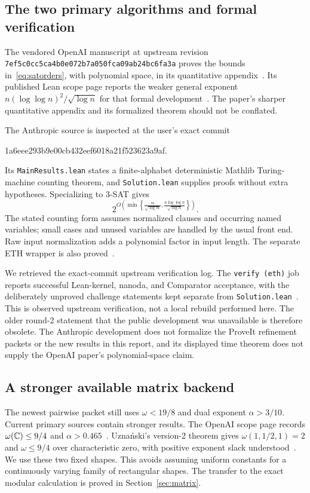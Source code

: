 \subsection{The two primary algorithms and formal verification}

The vendored OpenAI manuscript at upstream revision
\nolinkurl{7ef5c0cc5ca4b0e072b7a050fca09ab24bc6fa3a} proves the bounds
in~\eqref{eq:satorders}, with polynomial space, in its quantitative
appendix~\cite{openai}. Its published Lean scope page reports the weaker
general exponent $n(\log\log n)^2/\sqrt{\log n}$ for that formal
development~\cite{openaiscope}. The paper's sharper quantitative appendix
and its formalized theorem should not be conflated.

The Anthropic source is inspected at the user's exact commit
\begin{center}\small\ttfamily
1a6eee293b9e00cb432eef6018a21f523623a9af.
\end{center}
Its \texttt{MainResults.lean} states a finite-alphabet deterministic
Mathlib Turing-machine counting theorem, and \texttt{Solution.lean}
supplies proofs without extra hypotheses. Specializing to 3-SAT gives
\begin{equation}\label{eq:anthropic}
 2^{O\left(\min\left\{
       \frac{m}{\sqrt{\log m}},
       \frac{n\log\log n}{\sqrt{\log n}}
       \right\}\right)}.
\end{equation}
The stated counting form assumes normalized clauses and occurring named
variables; small cases and unused variables are handled by the usual
front end. Raw input normalization adds a polynomial factor in input
length. The separate ETH wrapper is also proved~\cite{anthropiccode}.

We retrieved the exact-commit upstream verification log. The
\texttt{verify (eth)} job reports successful Lean-kernel, nanoda, and
Comparator acceptance, with the deliberately unproved challenge statements
kept separate from \texttt{Solution.lean}~\cite{anthropicci}. This is
observed upstream verification, not a local rebuild performed here. The
older round-2 statement that the public development was unavailable is
therefore obsolete. The Anthropic development does not formalize the
ProveIt refinement packets or the new results in this report, and its
displayed time theorem does not supply the OpenAI paper's polynomial-space
claim.

\subsection{A stronger available matrix backend}

The newest pairwise packet still uses $\omega<19/8$ and dual exponent
$\alpha>3/10$. Current primary sources contain stronger results.
The OpenAI scope page records $\omega(\mathbb C)\le9/4$ and
$\alpha>0.465$~\cite{matrixscope}. Uzna\'nski's version-2 theorem gives
$\omega(1,1/2,1)=2$ and $\omega\le9/4$ over characteristic zero, with
positive exponent slack understood~\cite{uznanski}. We use these two
fixed shapes. This avoids assuming uniform constants for a continuously
varying family of rectangular shapes. The transfer to the exact modular
calculation is proved in Section~\ref{sec:matrix}.
